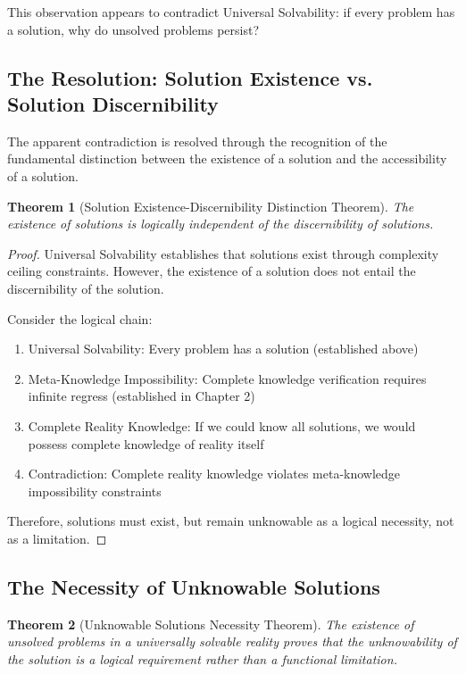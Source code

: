 \documentclass[12pt,a4paper]{article}
\newtheorem{theorem}{Theorem}[section]
\begin{document}
This observation appears to contradict Universal Solvability: if every problem has a solution, why do unsolved problems persist?

\subsection{The Resolution: Solution Existence vs. Solution Discernibility}

The apparent contradiction is resolved through the recognition of the fundamental distinction between the existence of a solution and the accessibility of a solution.

\begin{theorem}[Solution Existence-Discernibility Distinction Theorem]
The existence of solutions is logically independent of the discernibility of solutions.
\end{theorem}

\begin{proof}
Universal Solvability establishes that solutions exist through complexity ceiling constraints. However, the existence of a solution does not entail the discernibility of the solution.

Consider the logical chain:
\begin{enumerate}
\item Universal Solvability: Every problem has a solution (established above)
\item Meta-Knowledge Impossibility: Complete knowledge verification requires infinite regress (established in Chapter 2)
\item Complete Reality Knowledge: If we could know all solutions, we would possess complete knowledge of reality itself
\item Contradiction: Complete reality knowledge violates meta-knowledge impossibility constraints
\end{enumerate}

Therefore, solutions must exist, but remain unknowable as a logical necessity, not as a limitation.
\end{proof}

\subsection{The Necessity of Unknowable Solutions}

\begin{theorem}[Unknowable Solutions Necessity Theorem]
The existence of unsolved problems in a universally solvable reality proves that the unknowability of the solution is a logical requirement rather than a functional limitation.
\end{theorem}
\end{document}
